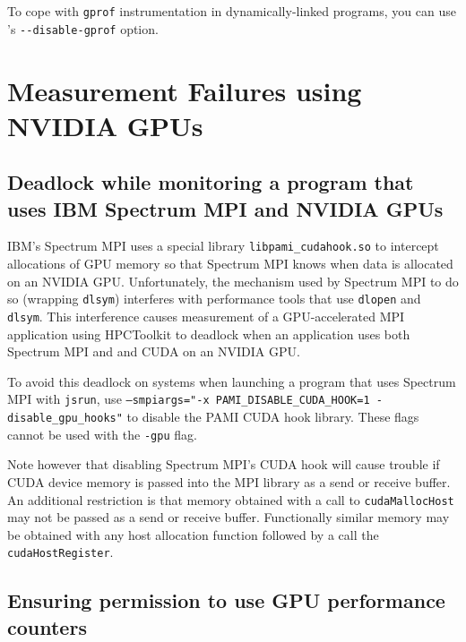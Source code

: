 \documentclass[11pt,twoside,letterpaper]{report}
\begin{document}
To cope with {\tt gprof} instrumentation in dynamically-linked programs, you can use \hpcrun{}'s \verb|--disable-gprof| option.


\section{Measurement Failures using NVIDIA GPUs}

\subsection{Deadlock while monitoring a program that uses IBM Spectrum MPI and NVIDIA GPUs}

IBM's Spectrum MPI uses a special library {\tt libpami\_cudahook.so} to intercept allocations of GPU memory so that Spectrum MPI knows when data is allocated on an NVIDIA GPU. 
Unfortunately, the mechanism used by Spectrum MPI to do so (wrapping {\tt dlsym}) interferes with performance tools that use {\tt dlopen} and {\tt dlsym}. 
This interference causes measurement of a GPU-accelerated MPI application using HPCToolkit to deadlock when an application uses both Spectrum MPI and and CUDA on an NVIDIA GPU. 

To avoid this deadlock on systems when launching a program that uses Spectrum MPI with  {\tt jsrun}, use {\tt --smpiargs="-x PAMI\_DISABLE\_CUDA\_HOOK=1 -disable\_gpu\_hooks"} to disable the PAMI CUDA hook library.  
These flags  cannot be used with the {\tt -gpu} flag. 

Note however that disabling Spectrum MPI's CUDA hook will cause trouble if CUDA device memory is passed into the MPI library as a send or receive buffer. 
An additional restriction is that memory obtained with a call to {\tt cudaMallocHost} may not be passed as a send or receive buffer. 
Functionally similar memory may be obtained with any host allocation function followed by a call the {\tt cudaHostRegister}. 


\subsection{Ensuring permission to use GPU performance counters}
\end{document}
